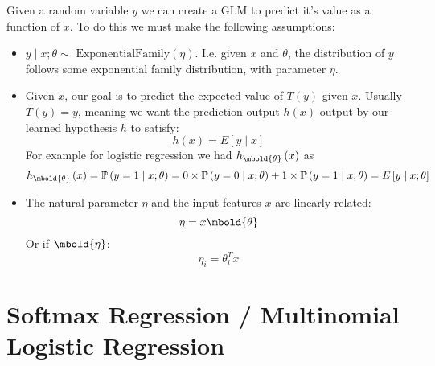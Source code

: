 \documentclass[12pt letter]{report}
\begin{document}
Given a random variable $y$ we can create a GLM to predict it's value as a function of $x$. To do
this we must make the following assumptions:
\begin{itemize}
  \item $y  \mid x; \theta \sim \text{ ExponentialFamily} \left( \eta \right) $. I.e. given $x$ and $\theta$, the
        distribution of $y$ follows some exponential family distribution, with parameter $\eta$.
  \item Given $x$, our goal is to predict the expected value of $T \left( y \right) $ given $x$. Usually $T \left(
          y\right) = y $, meaning we want the prediction output $h \left( x \right) $ output by our learned hypothesis
        $h$ to satisfy:
        \[
          h \left( x \right) = E \left[ y  \mid x \right]
        \]
        For example for logistic regression we had $h_{\mbold{\theta}} \left( x \right)$ as
        \[
          h_{\mbold{\theta}} \left( x \right) = \mathbb{P} \left( y = 1  \mid
          x; \theta\right) = 0 \times \mathbb{P} \left( y = 0  \mid x; \theta \right) + 1 \times \mathbb{P} \left( y = 1
          \mid x; \theta \right) = E \left[ y  \mid x; \theta \right]
        \]
  \item The natural parameter $\eta$ and the input features $x$ are linearly related:
        \[
          \eta = x \mbold{\theta}
        \]
        Or if $\mbold{\eta}$:
        \[
          \eta_i = \theta^{T}_i x
        \]
\end{itemize}

\chapter{Softmax Regression / Multinomial Logistic Regression}
\end{document}
